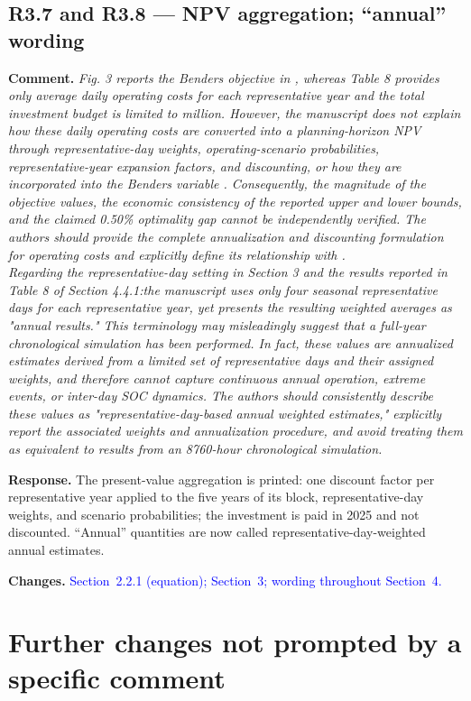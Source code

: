 \documentclass[11pt]{article}
\newcommand{\rcomment}[1]{\par\medskip\noindent\textbf{Comment.} \textit{#1}\par\smallskip}
\newcommand{\rresponse}[1]{\noindent\textbf{Response.} #1\par\smallskip}
\newcommand{\rchanges}[1]{\noindent\textbf{Changes.} \textcolor{blue}{#1}\par\medskip}
\begin{document}
\subsection*{R3.7 and R3.8 --- NPV aggregation; ``annual'' wording}
\rcomment{
Fig. 3 reports the Benders objective in , whereas Table 8 provides only average daily operating costs for each representative year and the total investment budget is limited to million. However, the manuscript does not explain how these daily operating costs are converted into a planning-horizon NPV through representative-day weights, operating-scenario probabilities, representative-year expansion factors, and discounting, or how they are incorporated into the Benders variable . Consequently, the magnitude of the objective values, the economic consistency of the reported upper and lower bounds, and the claimed 0.50\% optimality gap cannot be independently verified. The authors should provide the complete annualization and discounting formulation for operating costs and explicitly define its relationship with .\\
Regarding the representative-day setting in Section 3 and the results reported in Table 8 of Section 4.4.1:the manuscript uses only four seasonal representative days for each representative year, yet presents the resulting weighted averages as "annual results." This terminology may misleadingly suggest that a full-year chronological simulation has been performed. In fact, these values are annualized estimates derived from a limited set of representative days and their assigned weights, and therefore cannot capture continuous annual operation, extreme events, or inter-day SOC dynamics. The authors should consistently describe these values as "representative-day-based annual weighted estimates," explicitly report the associated weights and annualization procedure, and avoid treating them as equivalent to results from an 8760-hour chronological simulation.
}
\rresponse{The present-value aggregation is printed: one discount factor per representative year applied to
the five years of its block, representative-day weights, and scenario probabilities; the investment is
paid in 2025 and not discounted. ``Annual'' quantities are now called representative-day-weighted annual
estimates.}
\rchanges{Section~2.2.1 (equation); Section~3; wording throughout Section~4.}

\section*{Further changes not prompted by a specific comment}
\end{document}
